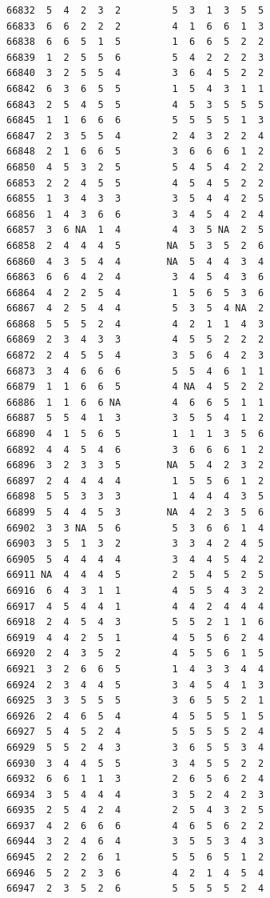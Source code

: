 \documentclass[
  letterpaper,
  DIV=11,
  numbers=noendperiod]{scrreprt}
\begin{document}
\begin{verbatim}
66832  5  4  2  3  2         5  3  1  3  5  5
66833  6  6  2  2  2         4  1  6  6  1  3
66838  6  6  5  1  5         1  6  6  5  2  2
66839  1  2  5  5  6         5  4  2  2  2  3
66840  3  2  5  5  4         3  6  4  5  2  2
66842  6  3  6  5  5         1  5  4  3  1  1
66843  2  5  4  5  5         4  5  3  5  5  5
66845  1  1  6  6  6         5  5  5  5  1  3
66847  2  3  5  5  4         2  4  3  2  2  4
66848  2  1  6  6  5         3  6  6  6  1  2
66850  4  5  3  2  5         5  4  5  4  2  2
66853  2  2  4  5  5         4  5  4  5  2  2
66855  1  3  4  3  3         3  5  4  4  2  5
66856  1  4  3  6  6         3  4  5  4  2  4
66857  3  6 NA  1  4         4  3  5 NA  2  5
66858  2  4  4  4  5        NA  5  3  5  2  6
66860  4  3  5  4  4        NA  5  4  4  3  4
66863  6  6  4  2  4         3  4  5  4  3  6
66864  4  2  2  5  4         1  5  6  5  3  6
66867  4  2  5  4  4         5  3  5  4 NA  2
66868  5  5  5  2  4         4  2  1  1  4  3
66869  2  3  4  3  3         4  5  5  2  2  2
66872  2  4  5  5  4         3  5  6  4  2  3
66873  3  4  6  6  6         5  5  4  6  1  1
66879  1  1  6  6  5         4 NA  4  5  2  2
66886  1  1  6  6 NA         4  6  6  5  1  1
66887  5  5  4  1  3         3  5  5  4  1  2
66890  4  1  5  6  5         1  1  1  3  5  6
66892  4  4  5  4  6         3  6  6  6  1  2
66896  3  2  3  3  5        NA  5  4  2  3  2
66897  2  4  4  4  4         1  5  5  6  1  2
66898  5  5  3  3  3         1  4  4  4  3  5
66899  5  4  4  5  3        NA  4  2  3  5  6
66902  3  3 NA  5  6         5  3  6  6  1  4
66903  3  5  1  3  2         3  3  4  2  4  5
66905  5  4  4  4  4         3  4  4  5  4  2
66911 NA  4  4  4  5         2  5  4  5  2  5
66916  6  4  3  1  1         4  5  5  4  3  2
66917  4  5  4  4  1         4  4  2  4  4  4
66918  2  4  5  4  3         5  5  2  1  1  6
66919  4  4  2  5  1         4  5  5  6  2  4
66920  2  4  3  5  2         4  5  5  6  1  5
66921  3  2  6  6  5         1  4  3  3  4  4
66924  2  3  4  4  5         3  4  5  4  1  3
66925  3  3  5  5  5         3  6  5  5  2  1
66926  2  4  6  5  4         4  5  5  5  1  5
66927  5  4  5  2  4         5  5  5  5  2  4
66929  5  5  2  4  3         3  6  5  5  3  4
66930  3  4  4  5  5         3  4  5  5  2  2
66932  6  6  1  1  3         2  6  5  6  2  4
66934  3  5  4  4  4         3  5  2  4  2  3
66935  2  5  4  2  4         2  5  4  3  2  5
66937  4  2  6  6  6         4  6  5  6  2  2
66944  3  2  4  6  4         3  5  5  3  4  3
66945  2  2  2  6  1         5  5  6  5  1  2
66946  5  2  2  3  6         4  2  1  4  5  4
66947  2  3  5  2  6         5  5  5  5  2  4

\end{verbatim}
\end{document}
